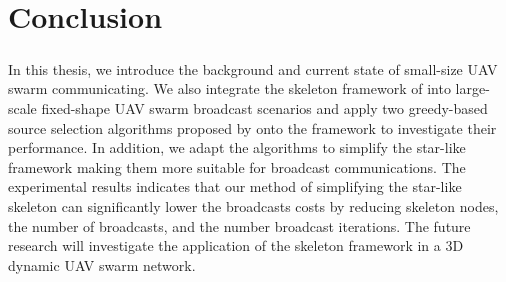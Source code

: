 \documentclass[a4paper,12pt]{report}
\begin{document}



\chapter{Conclusion}
\paragraph{}
In this thesis, we introduce the background and current state of small-size UAV swarm communicating. We also integrate the skeleton framework of \cite{ssr} into large-scale fixed-shape UAV swarm broadcast scenarios and apply two greedy-based source selection algorithms proposed by \cite{prose} onto the framework to investigate their performance. In addition, we adapt the algorithms to simplify the star-like framework making them more suitable for broadcast communications. The experimental results indicates that our method of simplifying the star-like skeleton can significantly lower the broadcasts costs by reducing skeleton nodes, the number of broadcasts, and the number broadcast iterations. The future research will investigate the application of the skeleton framework in a 3D dynamic UAV swarm network.





\end{document}
